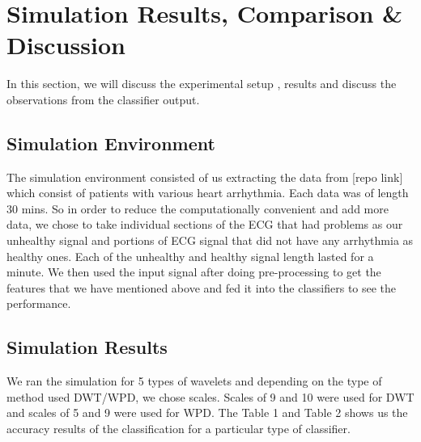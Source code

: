\documentclass[10pt,twocolumn,letterpaper]{article}
\begin{document}
\section{Simulation Results, Comparison \& Discussion}
In this section, we will discuss the experimental setup , results and discuss the observations from the classifier output.
\subsection{Simulation Environment}
The simulation environment consisted of us extracting the data from [repo link] which consist of patients with various heart arrhythmia. Each data was of length 30 mins. So in order to reduce the computationally convenient and add more data, we chose to take individual sections of the ECG that had problems as our unhealthy signal and portions of ECG signal that did not have any arrhythmia as healthy ones. Each of the unhealthy and healthy signal length lasted for a minute. We then used the input signal after doing pre-processing to get the features that we have mentioned above and fed it into the classifiers to see the performance.

\subsection{Simulation Results} 
We ran the simulation for 5 types of wavelets and depending on the type of method used DWT/WPD, we chose scales. Scales of 9 and 10 were used for DWT and scales of 5 and 9 were used for WPD. The Table 1 and Table 2 shows us the accuracy results of the classification for a particular type of classifier. 
\end{document}
